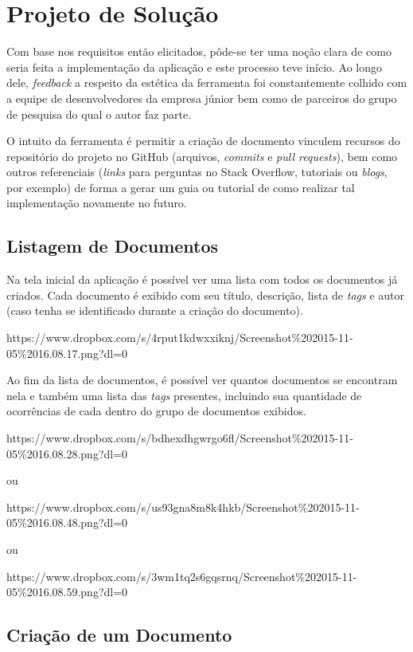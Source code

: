 \chapter{Projeto de Solução}

Com base nos requisitos então elicitados, pôde-se ter uma noção clara de como seria feita a implementação da aplicação e este processo teve início. Ao longo dele, \textit{feedback} a respeito da estética da ferramenta foi constantemente colhido com a equipe de desenvolvedores da empresa júnior bem como de parceiros do grupo de pesquisa do qual o autor faz parte.

O intuito da ferramenta é permitir a criação de documento vinculem recursos do repositório do projeto no GitHub (arquivos, \textit{commits} e \textit{pull requests}), bem como outros referenciais (\textit{links} para perguntas no Stack Overflow, tutoriais ou \textit{blogs}, por exemplo) de forma a gerar um guia ou tutorial de como realizar tal implementação novamente no futuro.

\section{Listagem de Documentos}

Na tela inicial da aplicação é possível ver uma lista com todos os documentos já criados. Cada documento é exibido com seu título, descrição, lista de \textit{tags} e autor (caso tenha se identificado durante a criação do documento).

https://www.dropbox.com/s/4rput1kdwxxiknj/Screenshot\%202015-11-05\%2016.08.17.png?dl=0

Ao fim da lista de documentos, é possível ver quantos documentos se encontram nela e também uma lista das \textit{tags} presentes, incluindo sua quantidade de ocorrências de cada dentro do grupo de documentos exibidos.

https://www.dropbox.com/s/bdhexdhgwrgo6fl/Screenshot\%202015-11-05\%2016.08.28.png?dl=0

ou

https://www.dropbox.com/s/us93gna8m8k4hkb/Screenshot\%202015-11-05\%2016.08.48.png?dl=0

ou

https://www.dropbox.com/s/3wm1tq2s6gqsrnq/Screenshot\%202015-11-05\%2016.08.59.png?dl=0

\section{Criação de um Documento}

